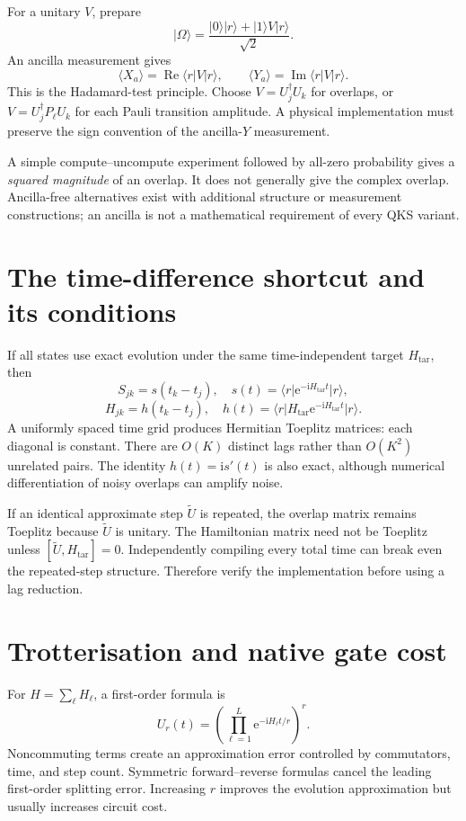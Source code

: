 \documentclass[11pt,a4paper,oneside]{report}
\newcommand{\ket}[1]{\lvert #1\rangle}
\newcommand{\bra}[1]{\langle #1\rvert}
\newcommand{\expect}[1]{\langle #1\rangle}
\newcommand{\Ht}{H_{\mathrm{tar}}}
\newcommand{\I}{\mathrm i}
\newcommand{\e}{\mathrm e}
\begin{document}
For a unitary $V$, prepare
\begin{equation}
\ket\Omega=\frac{\ket0\ket r+\ket1 V\ket r}{\sqrt2}.
\end{equation}
An ancilla measurement gives
\begin{equation}
\expect{X_a}=\operatorname{Re}\bra rV\ket r,\qquad
\expect{Y_a}=\operatorname{Im}\bra rV\ket r.
\end{equation}
This is the Hadamard-test principle. Choose $V=U_j^\dagger U_k$ for overlaps, or $V=U_j^\dagger P_\ell U_k$ for each Pauli transition amplitude. A physical implementation must preserve the sign convention of the ancilla-$Y$ measurement.

A simple compute--uncompute experiment followed by all-zero probability gives a \emph{squared magnitude} of an overlap. It does not generally give the complex overlap. Ancilla-free alternatives exist with additional structure or measurement constructions; an ancilla is not a mathematical requirement of every QKS variant.

\section{The time-difference shortcut and its conditions}
If all states use exact evolution under the same time-independent target $\Ht$, then
\begin{equation}\label{eq:toeplitz}
S_{jk}=s(t_k-t_j),\quad s(t)=\bra r\e^{-\I\Ht t}\ket r,
\end{equation}
\begin{equation}
H_{jk}=h(t_k-t_j),\quad h(t)=\bra r\Ht\e^{-\I\Ht t}\ket r.
\end{equation}
A uniformly spaced time grid produces Hermitian Toeplitz matrices: each diagonal is constant. There are $O(K)$ distinct lags rather than $O(K^2)$ unrelated pairs. The identity $h(t)=\I s'(t)$ is also exact, although numerical differentiation of noisy overlaps can amplify noise.

If an identical approximate step $\widetilde U$ is repeated, the overlap matrix remains Toeplitz because $\widetilde U$ is unitary. The Hamiltonian matrix need not be Toeplitz unless $[\widetilde U,\Ht]=0$. Independently compiling every total time can break even the repeated-step structure. Therefore verify the implementation before using a lag reduction.

\section{Trotterisation and native gate cost}
For $H=\sum_\ell H_\ell$, a first-order formula is
\begin{equation}
U_r(t)=\left(\prod_{\ell=1}^{L}\e^{-\I H_\ell t/r}\right)^r.
\end{equation}
Noncommuting terms create an approximation error controlled by commutators, time, and step count. Symmetric forward--reverse formulas cancel the leading first-order splitting error. Increasing $r$ improves the evolution approximation but usually increases circuit cost.
\end{document}
